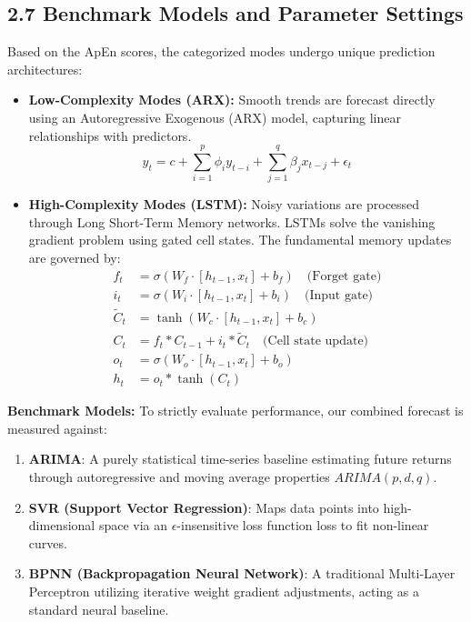 \documentclass[11pt,a4paper]{article}
\begin{document}
\subsection{2.7 Benchmark Models and Parameter Settings}
Based on the ApEn scores, the categorized modes undergo unique prediction architectures:
\begin{itemize}
    \item \textbf{Low-Complexity Modes (ARX):} Smooth trends are forecast directly using an Autoregressive Exogenous (ARX) model, capturing linear relationships with predictors.
    \begin{equation}
    y_t = c + \sum_{i=1}^p \phi_i y_{t-i} + \sum_{j=1}^q \beta_j x_{t-j} + \epsilon_t
    \end{equation}
    \item \textbf{High-Complexity Modes (LSTM):} Noisy variations are processed through Long Short-Term Memory networks. LSTMs solve the vanishing gradient problem using gated cell states. The fundamental memory updates are governed by:
    \begin{align}
    f_t &= \sigma(W_f \cdot [h_{t-1}, x_t] + b_f) \quad \text{(Forget gate)} \\
    i_t &= \sigma(W_i \cdot [h_{t-1}, x_t] + b_i) \quad \text{(Input gate)} \\
    \tilde{C}_t &= \tanh(W_c \cdot [h_{t-1}, x_t] + b_c) \\
    C_t &= f_t * C_{t-1} + i_t * \tilde{C}_t \quad \text{(Cell state update)} \\
    o_t &= \sigma(W_o \cdot [h_{t-1}, x_t] + b_o) \\
    h_t &= o_t * \tanh(C_t)
    \end{align}
\end{itemize}

\textbf{Benchmark Models:} To strictly evaluate performance, our combined forecast is measured against:
\begin{enumerate}
    \item \textbf{ARIMA}: A purely statistical time-series baseline estimating future returns through autoregressive and moving average properties $ARIMA(p, d, q)$.
    \item \textbf{SVR (Support Vector Regression)}: Maps data points into high-dimensional space via an $\epsilon$-insensitive loss function loss to fit non-linear curves.
    \item \textbf{BPNN (Backpropagation Neural Network)}: A traditional Multi-Layer Perceptron utilizing iterative weight gradient adjustments, acting as a standard neural baseline.
\end{enumerate}
\end{document}
